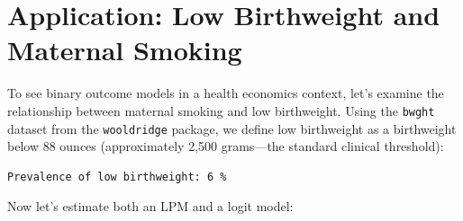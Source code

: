\documentclass[
  letterpaper,
  DIV=11,
  numbers=noendperiod]{scrreprt}
\newenvironment{Shaded}{\begin{snugshade}}{\end{snugshade}}
\newcommand{\AttributeTok}[1]{\textcolor[rgb]{0.40,0.45,0.13}{#1}}
\newcommand{\DecValTok}[1]{\textcolor[rgb]{0.68,0.00,0.00}{#1}}
\newcommand{\FunctionTok}[1]{\textcolor[rgb]{0.28,0.35,0.67}{#1}}
\newcommand{\NormalTok}[1]{\textcolor[rgb]{0.00,0.23,0.31}{#1}}
\newcommand{\OtherTok}[1]{\textcolor[rgb]{0.00,0.23,0.31}{#1}}
\newcommand{\SpecialCharTok}[1]{\textcolor[rgb]{0.37,0.37,0.37}{#1}}
\newcommand{\StringTok}[1]{\textcolor[rgb]{0.13,0.47,0.30}{#1}}
\begin{document}
\section{Application: Low Birthweight and Maternal
Smoking}\label{application-low-birthweight-and-maternal-smoking}

To see binary outcome models in a health economics context, let's
examine the relationship between maternal smoking and low birthweight.
Using the \texttt{bwght} dataset from the \texttt{wooldridge} package,
we define low birthweight as a birthweight below 88 ounces
(approximately 2,500 grams---the standard clinical threshold):

\begin{Shaded}
\end{Shaded}

\begin{verbatim}
Prevalence of low birthweight: 6 %
\end{verbatim}

Now let's estimate both an LPM and a logit model:
\end{document}
